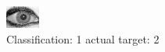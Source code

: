\begin{figure}[h!]
\begin{center}
\includegraphics[width=0.60\columnwidth]{figures/ID1993_class_1_target_2.png}
\end{center}
\caption{ Classification: 1 actual target: 2}
\label{fig:ID1993_class_1_target_2}
\end{figure}
